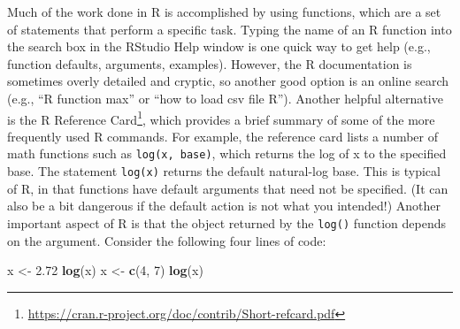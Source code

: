 \documentclass[
]{krantz}
\makeatletter
\newenvironment{Shaded}{\begin{snugshade}}{\end{snugshade}}
\newcommand{\DecValTok}[1]{\textcolor[rgb]{0.06,0.06,0.06}{#1}}
\newcommand{\FloatTok}[1]{\textcolor[rgb]{0.06,0.06,0.06}{#1}}
\newcommand{\FunctionTok}[1]{\textcolor[rgb]{0.27,0.27,0.27}{\textbf{#1}}}
\newcommand{\NormalTok}[1]{#1}
\newcommand{\OtherTok}[1]{\textcolor[rgb]{0.37,0.37,0.37}{#1}}
\renewcommand{\href}[2]{#2\footnote{\url{#1}}}
\newenvironment{kframe}{%
\medskip{}
\setlength{\fboxsep}{.8em}
 \def\at@end@of@kframe{}%
 \ifinner\ifhmode%
  \def\at@end@of@kframe{\end{minipage}}%
  \begin{minipage}{\columnwidth}%
 \fi\fi%
 \def\FrameCommand##1{\hskip\@totalleftmargin \hskip-\fboxsep
 \colorbox{shadecolor}{##1}\hskip-\fboxsep
     \hskip-\linewidth \hskip-\@totalleftmargin \hskip\columnwidth}%
 \MakeFramed {\advance\hsize-\width
   \@totalleftmargin\z@ \linewidth\hsize
   \@setminipage}}%
 {\par\unskip\endMakeFramed%
 \at@end@of@kframe}
\renewenvironment{Shaded}{\begin{kframe}}{\end{kframe}}
\makeatother
\begin{document}
Much of the work done in R is accomplished by using functions, which are a set of statements that perform a specific task. Typing the name of an R function into the search box in the RStudio Help window is one quick way to get help (e.g., function defaults, arguments, examples). However, the R documentation is sometimes overly detailed and cryptic, so another good option is an online search (e.g., ``R function max'' or ``how to load csv file R''). Another helpful alternative is the \href{https://cran.r-project.org/doc/contrib/Short-refcard.pdf}{R Reference Card}, which provides a brief summary of some of the more frequently used R commands. For example, the reference card lists a number of math functions such as \texttt{log(x,\ base)}, which returns the log of x to the specified base. The statement \texttt{log(x)} returns the default natural-log base. This is typical of R, in that functions have default arguments that need not be specified. (It can also be a bit dangerous if the default action is not what you intended!) Another important aspect of R is that the object returned by the \texttt{log()} function depends on the argument. Consider the following four lines of code:

\begin{Shaded}
\begin{Highlighting}[]
\NormalTok{x }\OtherTok{\textless{}{-}} \FloatTok{2.72}
\FunctionTok{log}\NormalTok{(x)}
\NormalTok{x }\OtherTok{\textless{}{-}} \FunctionTok{c}\NormalTok{(}\DecValTok{4}\NormalTok{, }\DecValTok{7}\NormalTok{)}
\FunctionTok{log}\NormalTok{(x)}
\end{Highlighting}
\end{Shaded}
\end{document}

